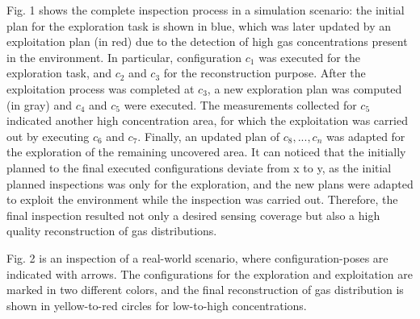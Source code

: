 Fig. 1 shows the complete inspection process in a simulation scenario: the initial plan for the exploration task is shown in blue, which was later updated by an exploitation plan (in red) due to the detection of high gas concentrations present in the environment. In particular, configuration $c_1$ was executed for the exploration task, and $c_2$ and $c_3$ for the reconstruction purpose. After the exploitation process was completed at $c_3$, a new exploration plan was computed (in gray) and $c_4$ and $c_5$ were executed. The measurements collected for $c_5$ indicated another high concentration area, for which the exploitation was carried out by executing $c_6$ and $c_7$. Finally, an updated plan of $c_8,...,c_n$ was adapted for the exploration of the remaining uncovered area. It can noticed that the initially planned to the final executed configurations deviate from x to y, as the initial planned inspections was only for the exploration, and the new plans were adapted to exploit the environment while the inspection was carried out. %
Therefore, the final inspection resulted not only a desired sensing coverage but also a high quality reconstruction of gas distributions.

Fig. 2 is an inspection of a real-world scenario, where configuration-poses are indicated with arrows. The configurations for the exploration and exploitation are marked in two different colors, and the final reconstruction of gas distribution is shown in yellow-to-red circles for low-to-high concentrations.

